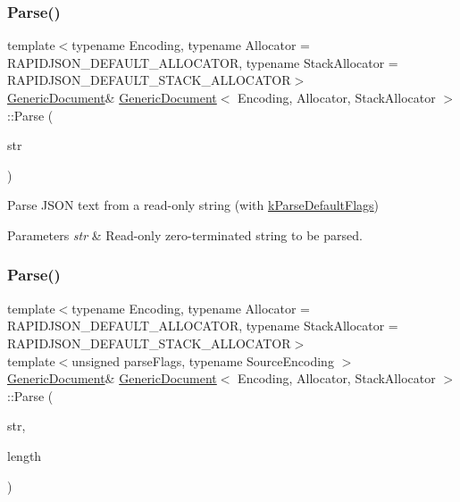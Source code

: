 \subsubsection{\texorpdfstring{Parse()}{Parse()}\hspace{0.1cm}{\footnotesize\ttfamily [3/6]}}
{\footnotesize\ttfamily template$<$typename Encoding, typename Allocator = R\+A\+P\+I\+D\+J\+S\+O\+N\+\_\+\+D\+E\+F\+A\+U\+L\+T\+\_\+\+A\+L\+L\+O\+C\+A\+T\+OR, typename Stack\+Allocator = R\+A\+P\+I\+D\+J\+S\+O\+N\+\_\+\+D\+E\+F\+A\+U\+L\+T\+\_\+\+S\+T\+A\+C\+K\+\_\+\+A\+L\+L\+O\+C\+A\+T\+OR$>$ \\
\hyperlink{classGenericDocument}{Generic\+Document}\& \hyperlink{classGenericDocument}{Generic\+Document}$<$ Encoding, Allocator, Stack\+Allocator $>$\+::Parse (\begin{DoxyParamCaption}\item[{const \hyperlink{classGenericValue_ade0e0ce64ccd5d852da57a35e720bafb}{Ch} $\ast$}]{str }\end{DoxyParamCaption})\hspace{0.3cm}{\ttfamily [inline]}}



Parse J\+S\+ON text from a read-\/only string (with \hyperlink{reader_8h_ab7be7dabe6ffcba60fad441505583450a9104b0946d648e9467cb7a967401ec80}{k\+Parse\+Default\+Flags}) 


\begin{DoxyParams}{Parameters}
{\em str} & Read-\/only zero-\/terminated string to be parsed. \\
\hline
\end{DoxyParams}
\mbox{\label{classGenericDocument_a46b5028cc760c4e915a0d5216af9f7e2}} 
\subsubsection{\texorpdfstring{Parse()}{Parse()}\hspace{0.1cm}{\footnotesize\ttfamily [4/6]}}
{\footnotesize\ttfamily template$<$typename Encoding, typename Allocator = R\+A\+P\+I\+D\+J\+S\+O\+N\+\_\+\+D\+E\+F\+A\+U\+L\+T\+\_\+\+A\+L\+L\+O\+C\+A\+T\+OR, typename Stack\+Allocator = R\+A\+P\+I\+D\+J\+S\+O\+N\+\_\+\+D\+E\+F\+A\+U\+L\+T\+\_\+\+S\+T\+A\+C\+K\+\_\+\+A\+L\+L\+O\+C\+A\+T\+OR$>$ \\
template$<$unsigned parse\+Flags, typename Source\+Encoding $>$ \\
\hyperlink{classGenericDocument}{Generic\+Document}\& \hyperlink{classGenericDocument}{Generic\+Document}$<$ Encoding, Allocator, Stack\+Allocator $>$\+::Parse (\begin{DoxyParamCaption}\item[{const typename Source\+Encoding\+::\+Ch $\ast$}]{str,  }\item[{size\+\_\+t}]{length }\end{DoxyParamCaption})\hspace{0.3cm}{\ttfamily [inline]}}

